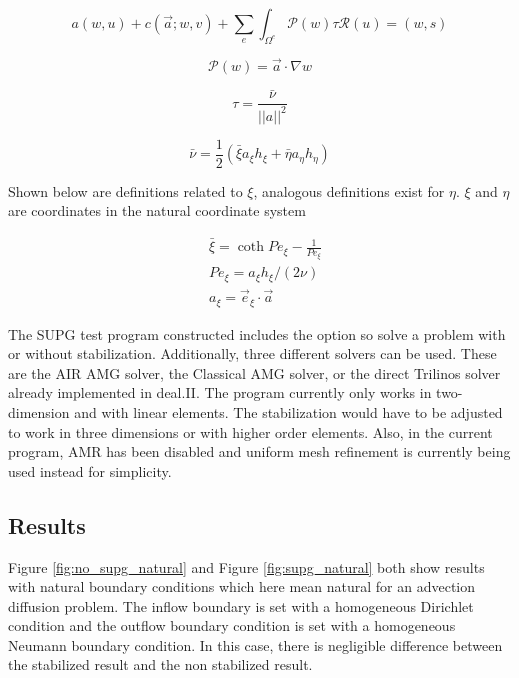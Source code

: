 \documentclass[11pt]{article}
\begin{document}
\begin{equation}
\label{sup_weak_with_stabil}
a(w,u) + c(\vec{a};w,v) + \sum_e \int_{\Omega^e}\mathcal{P}(w)\tau \mathcal{R}(u)=(w,s)
\end{equation}

\begin{equation}
\mathcal{P}(w) = \vec{a} \cdot \nabla w
\end{equation}

\begin{equation}
\tau = \frac{\bar{\nu}}{||a||^2}
\end{equation}

\begin{equation}
\bar{\nu}=\frac{1}{2}\left( \bar{\xi} a_\xi h_\xi + \bar{\eta} a_\eta h_\eta \right)
\end{equation}

Shown below are definitions related to $\xi$, analogous definitions exist for $\eta$. $\xi$ and $\eta$ are coordinates in the natural coordinate system

\begin{equation}
\begin{aligned}
&\bar{\xi} = \coth Pe_\xi - \frac{1}{Pe_\xi} \\
&Pe_\xi = a_\xi h_\xi / (2\nu) \\
&a_\xi = \vec{e}_\xi \cdot \vec{a}
\end{aligned}
\end{equation}

The SUPG test program constructed includes the option so solve a problem with or without stabilization. Additionally, three different solvers can be used. These are the AIR AMG solver, the Classical AMG solver, or the direct Trilinos solver already implemented in deal.II. The program currently only works in two-dimension and with linear elements. The stabilization would have to be adjusted to work in three dimensions or with higher order elements. Also, in the current program, AMR has been disabled and uniform mesh refinement is currently being used instead for simplicity.

\subsection{Results}
Figure \ref{fig:no_supg_natural} and Figure \ref{fig:supg_natural} both show results with natural boundary conditions which here mean natural for an advection diffusion problem. The inflow boundary is set with a homogeneous Dirichlet condition and the outflow boundary condition is set with a homogeneous Neumann boundary condition. In this case, there is negligible difference between the stabilized result and the non stabilized result.
\end{document}

